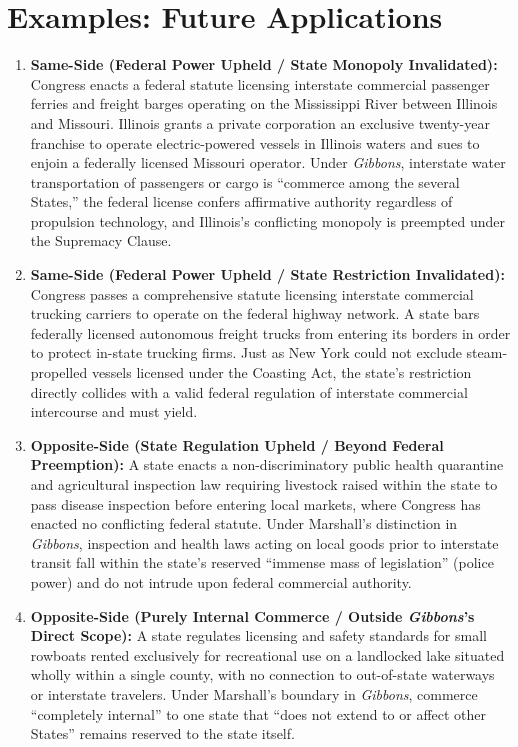 \documentclass[12pt]{article}
\begin{document}
\section{Examples: Future Applications}
\begin{enumerate}
\item \textbf{Same-Side (Federal Power Upheld / State Monopoly Invalidated):} Congress enacts a federal statute licensing interstate commercial passenger ferries and freight barges operating on the Mississippi River between Illinois and Missouri. Illinois grants a private corporation an exclusive twenty-year franchise to operate electric-powered vessels in Illinois waters and sues to enjoin a federally licensed Missouri operator. Under \textit{Gibbons}, interstate water transportation of passengers or cargo is ``commerce among the several States,'' the federal license confers affirmative authority regardless of propulsion technology, and Illinois's conflicting monopoly is preempted under the Supremacy Clause.
\item \textbf{Same-Side (Federal Power Upheld / State Restriction Invalidated):} Congress passes a comprehensive statute licensing interstate commercial trucking carriers to operate on the federal highway network. A state bars federally licensed autonomous freight trucks from entering its borders in order to protect in-state trucking firms. Just as New York could not exclude steam-propelled vessels licensed under the Coasting Act, the state's restriction directly collides with a valid federal regulation of interstate commercial intercourse and must yield.
\item \textbf{Opposite-Side (State Regulation Upheld / Beyond Federal Preemption):} A state enacts a non-discriminatory public health quarantine and agricultural inspection law requiring livestock raised within the state to pass disease inspection before entering local markets, where Congress has enacted no conflicting federal statute. Under Marshall's distinction in \textit{Gibbons}, inspection and health laws acting on local goods prior to interstate transit fall within the state's reserved ``immense mass of legislation'' (police power) and do not intrude upon federal commercial authority.
\item \textbf{Opposite-Side (Purely Internal Commerce / Outside \textit{Gibbons}'s Direct Scope):} A state regulates licensing and safety standards for small rowboats rented exclusively for recreational use on a landlocked lake situated wholly within a single county, with no connection to out-of-state waterways or interstate travelers. Under Marshall's boundary in \textit{Gibbons}, commerce ``completely internal'' to one state that ``does not extend to or affect other States'' remains reserved to the state itself.

\end{enumerate}
\end{document}
